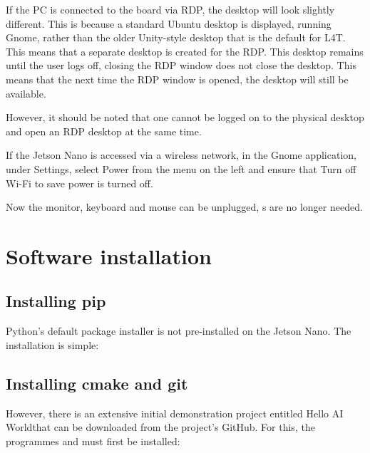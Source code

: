 If the PC is connected to the board via RDP, the desktop will look slightly different. This is because a standard Ubuntu desktop is displayed, running Gnome, rather than the older Unity-style desktop that is the default for L4T. This means that a separate desktop is created for the RDP. This desktop remains until the user logs off, closing the RDP window does not close the desktop. This means that the next time the RDP window is opened, the desktop will still be available.


However, it should be noted that one cannot be logged on to the physical desktop and open an RDP desktop at the same time.

If the Jetson Nano is accessed via a wireless network, in the Gnome application, under \glqq Settings\grqq{}, select \glqq Power\grqq{} from the menu on the left and ensure that \glqq Turn off Wi-Fi to save power\grqq{} is turned off.

Now the monitor, keyboard and mouse can be unplugged, s are no longer needed.

\section{Software installation}

\subsection{Installing   pip}

Python's default package installer  is not pre-installed on the Jetson Nano. The installation is simple:

\medskip


\medskip



	

\subsection{Installing  cmake and git}

However, there is an extensive initial demonstration project entitled \glqq Hello AI World\grqq that can be downloaded from the project's GitHub. For this, the programmes  and  must first be installed:

\medskip




